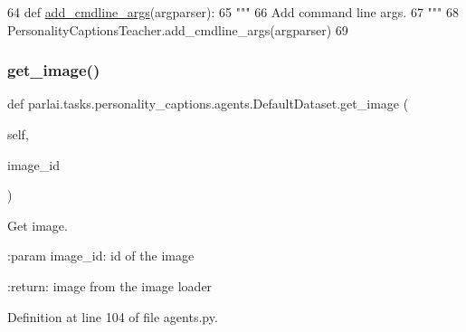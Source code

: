\begin{DoxyCode}
64     \textcolor{keyword}{def }\hyperlink{namespaceparlai_1_1agents_1_1drqa_1_1config_a62fdd5554f1da6be0cba185271058320}{add\_cmdline\_args}(argparser):
65         \textcolor{stringliteral}{"""}
66 \textcolor{stringliteral}{        Add command line args.}
67 \textcolor{stringliteral}{        """}
68         PersonalityCaptionsTeacher.add\_cmdline\_args(argparser)
69 
\end{DoxyCode}
\mbox{\label{classparlai_1_1tasks_1_1personality__captions_1_1agents_1_1DefaultDataset_a1af0abcddf51525898da67e2e796c525}} 
\subsubsection{\texorpdfstring{get\+\_\+image()}{get\_image()}}
{\footnotesize\ttfamily def parlai.\+tasks.\+personality\+\_\+captions.\+agents.\+Default\+Dataset.\+get\+\_\+image (\begin{DoxyParamCaption}\item[{}]{self,  }\item[{}]{image\+\_\+id }\end{DoxyParamCaption})}

\begin{DoxyVerb}Get image.

:param image_id:
    id of the image

:return:
    image from the image loader
\end{DoxyVerb}
 

Definition at line 104 of file agents.\+py.


